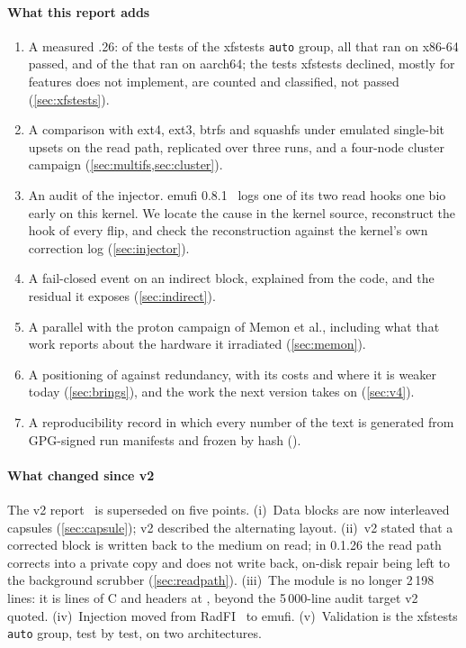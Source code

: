 \paragraph*{What this report adds}
\begin{enumerate}
\item A measured .26: of the \xfsTotal{} tests of the xfstests
  \texttt{auto} group, all \xfsXRan{} that ran on x86-64
  passed, and \xfsAPass{} of the \xfsARan{} that ran on aarch64; the
  tests xfstests declined, mostly for features \bfs does not implement,
  are counted and classified, not passed (\cref{sec:xfstests}).
\item A comparison with ext4, ext3, btrfs and squashfs under emulated
  single-bit upsets on the read path, replicated over three runs, and a
  four-node cluster campaign (\cref{sec:multifs,sec:cluster}).
\item An audit of the injector. emufi 0.8.1~\cite{desbrieres2026emufi}
  logs one of its two read hooks one bio early on this kernel. We locate
  the cause in the kernel source, reconstruct the hook of every flip,
  and check the reconstruction against the kernel's own correction log
  (\cref{sec:injector}).
\item A fail-closed event on an indirect block, explained from the code,
  and the residual it exposes (\cref{sec:indirect}).
\item A parallel with the proton campaign of Memon et al., including what
  that work reports about the hardware it irradiated (\cref{sec:memon}).
\item A positioning of \bfs against redundancy, with its costs and
  where it is weaker today (\cref{sec:brings}), and the work the next
  version takes on (\cref{sec:v4}).
\item A reproducibility record in which every number of the text is
  generated from GPG-signed run manifests and frozen by hash
  (\apprepro).
\end{enumerate}

\paragraph*{What changed since v2}
The v2 report~\cite{desbrieres2026beamfsv2} is superseded on five
points. (i)~Data blocks are now interleaved capsules
(\cref{sec:capsule}); v2 described the alternating layout. (ii)~v2 stated
that a corrected block is written back to the medium on read; in
0.1.26 the read path corrects into a private copy and does not write
back, on-disk repair being left to the background scrubber
(\cref{sec:readpath}). (iii)~The module is no longer 2\,198 lines: it is
\moduleLines{} lines of C and headers at \texttt{\commitBeamfs}, beyond the
5\,000-line audit target v2 quoted. (iv)~Injection moved from RadFI~\cite{desbrieres2026radfi} to
emufi. (v)~Validation is the xfstests \texttt{auto} group, test by test,
on two architectures.
